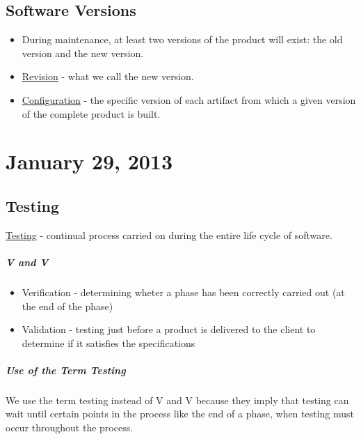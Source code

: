 \documentclass{report}
\begin{document}
		\section{Software Versions}
			\begin{itemize}
				\item During maintenance, at least two versions of the product will exist: the old version and the new version.
				\item \underline{Revision} - what we call the new version.
				\item \underline{Configuration} - the specific version of each artifact from which a given version of the complete product is built.
			\end{itemize}
	\chapter{January 29, 2013}	
		\section{Testing}
			\underline{Testing} - continual process carried on during the entire life cycle of software.\\
			\paragraph{V and V}
				\begin{itemize}
					\item Verification - determining wheter a phase has been correctly carried out (at the end of the phase) 
					\item Validation - testing just before a product is delivered to the client to determine if it satisfies the specifications
				\end{itemize}
			\paragraph{Use of the Term Testing}
				We use the term testing instead of V and V because they imply that testing can wait until certain points in the process like the end of a phase, when testing must occur throughout the process.
\end{document}
